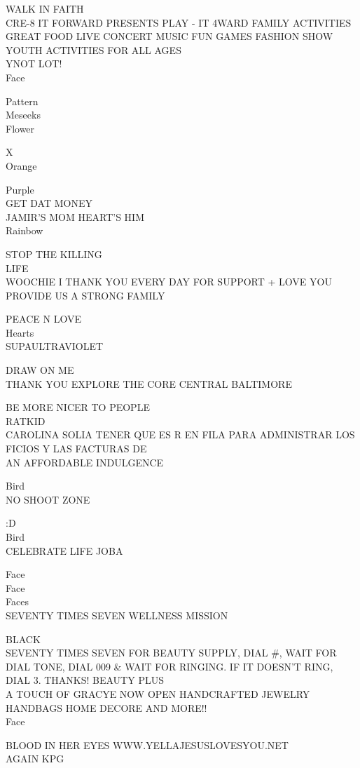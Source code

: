 \documentclass[10pt,letterpaper]{article}
\begin{document}
WALK IN FAITH\\
CRE{-}8 IT FORWARD PRESENTS PLAY {-} IT 4WARD FAMILY ACTIVITIES GREAT FOOD LIVE CONCERT MUSIC FUN GAMES FASHION SHOW YOUTH ACTIVITIES FOR ALL AGES\\
YNOT LOT!\\
Face

Pattern\\
Meseeks\\
Flower

X\\
Orange

Purple\\
GET DAT MONEY\\
JAMIR'S MOM HEART'S HIM\\
Rainbow

STOP THE KILLING\\
LIFE\\
WOOCHIE I THANK YOU EVERY DAY FOR SUPPORT + LOVE YOU PROVIDE US A STRONG FAMILY

PEACE N LOVE\\
Hearts\\
SUPAULTRAVIOLET

DRAW ON ME\\
THANK YOU EXPLORE THE CORE CENTRAL BALTIMORE

BE MORE NICER TO PEOPLE\\
RATKID\\
CAROLINA SOLIA TENER QUE ES R EN FILA PARA ADMINISTRAR LOS FICIOS Y LAS FACTURAS DE\\
AN AFFORDABLE INDULGENCE

Bird\\
NO SHOOT ZONE

:D\\
Bird\\
CELEBRATE LIFE JOBA

Face\\
Face\\
Faces\\
SEVENTY TIMES SEVEN WELLNESS MISSION

BLACK\\
SEVENTY TIMES SEVEN FOR BEAUTY SUPPLY, DIAL \#, WAIT FOR DIAL TONE, DIAL 009 \& WAIT FOR RINGING.  IF IT DOESN'T RING, DIAL 3.  THANKS!  BEAUTY PLUS\\
A TOUCH OF GRACYE NOW OPEN HANDCRAFTED JEWELRY HANDBAGS HOME DECORE AND MORE!!\\
Face

BLOOD IN HER EYES WWW.YELLAJESUSLOVESYOU.NET\\
AGAIN KPG
\end{document}
